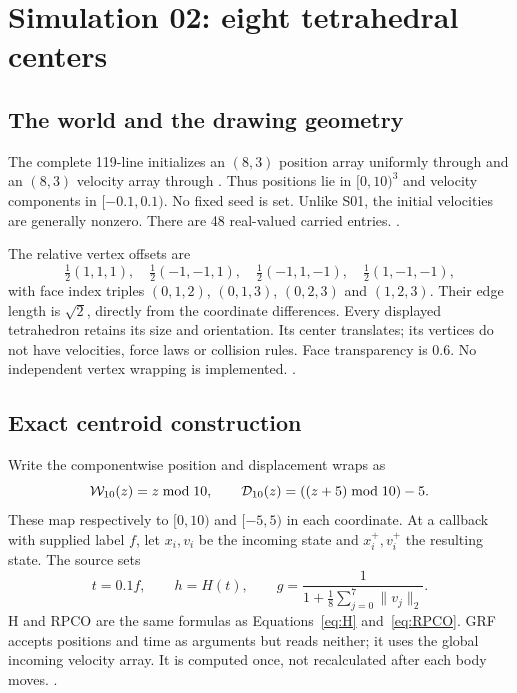\chapter{Simulation 02: eight tetrahedral centers}\label{ch:s02}

\section{The world and the drawing geometry}
The complete 119-line  initializes an $(8,3)$
position array uniformly through 
and an $(8,3)$ velocity array through
. Thus positions lie in $[0,10)^3$
and velocity components in $[-0.1,0.1)$. No fixed seed is set.
Unlike S01, the initial velocities are generally nonzero.
There are 48 real-valued carried entries. .

The relative vertex offsets are
\[
\tfrac12(1,1,1),\quad\tfrac12(-1,-1,1),\quad
\tfrac12(-1,1,-1),\quad\tfrac12(1,-1,-1),
\]
with face index triples $(0,1,2)$, $(0,1,3)$, $(0,2,3)$ and $(1,2,3)$.
Their edge length is $\sqrt2$, directly from the coordinate differences.
Every displayed tetrahedron retains its size and orientation. Its center
translates; its vertices do not have velocities, force laws or collision
rules. Face transparency is 0.6. No independent vertex wrapping is
implemented. . 

\section{Exact centroid construction}
Write the componentwise position and displacement wraps as
\begin{equation}\label{eq:wrap10}
\mathcal W_{10}(z)=z\bmod10,\qquad
\mathcal D_{10}(z)=((z+5)\bmod10)-5.
\end{equation}
These map respectively to $[0,10)$ and $[-5,5)$ in each coordinate.
At a callback with supplied label $f$, let $x_i,v_i$ be the incoming
state and $x_i^+,v_i^+$ the resulting state. The source sets
\begin{equation}\label{eq:shared02}
t=0.1f,\qquad h=H(t),\qquad
g=\frac{1}{1+\frac18\sum_{j=0}^7\|v_j\|_2}.
\end{equation}
H and RPCO are the same formulas as
Equations~\eqref{eq:H} and~\eqref{eq:RPCO}. GRF accepts positions and
time as arguments but reads neither; it uses the global incoming
velocity array. It is computed once, not recalculated after each
body moves. . 

